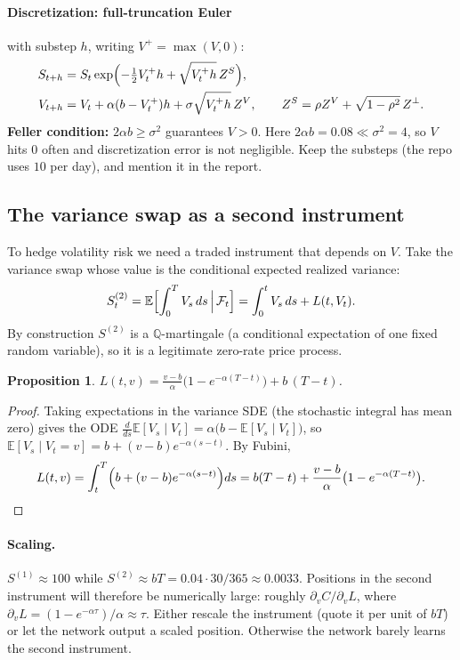 \documentclass[11pt]{article}
\newtheorem{proposition}[theorem]{Proposition}
\theoremstyle{definition}
\theoremstyle{remark}
\newcommand{\E}{\mathbb{E}}
\begin{document}
\paragraph{Discretization: full-truncation Euler} with substep $h$, writing $V^+=\max(V,0)$:
\begin{align*}
S_{t+h}&=S_t\exp\Bigl(-\tfrac12V_t^+h+\sqrt{V_t^+h}\,Z^S\Bigr),\\
V_{t+h}&=V_t+\alpha(b-V_t^+)h+\sigma\sqrt{V_t^+h}\,Z^V,\qquad Z^S=\rho Z^V+\sqrt{1-\rho^2}\,Z^\perp .
\end{align*}
\textbf{Feller condition:} $2\alpha b\ge\sigma^2$ guarantees $V>0$. Here $2\alpha b=0.08\ll\sigma^2=4$, so
$V$ hits $0$ often and discretization error is not negligible. Keep the substeps (the repo uses $10$ per day), and mention it in the report.

\subsection{The variance swap as a second instrument}

To hedge volatility risk we need a traded instrument that depends on $V$. Take the variance swap whose
value is the conditional expected realized variance:
\[
S^{(2)}_t=\E\Bigl[\int_0^TV_s\,ds\,\Big|\,\mathcal F_t\Bigr]=\int_0^tV_s\,ds+L(t,V_t).
\]
By construction $S^{(2)}$ is a $\mathbb Q$-martingale (a conditional expectation of one fixed random variable),
so it is a legitimate zero-rate price process.

\begin{proposition}
$\displaystyle L(t,v)=\frac{v-b}{\alpha}\bigl(1-e^{-\alpha(T-t)}\bigr)+b\,(T-t)$.
\end{proposition}

\begin{proof}
Taking expectations in the variance SDE (the stochastic integral has mean zero) gives the ODE
$\frac{d}{ds}\E[V_s\mid V_t]=\alpha\bigl(b-\E[V_s\mid V_t]\bigr)$, so
$\E[V_s\mid V_t=v]=b+(v-b)e^{-\alpha(s-t)}$. By Fubini,
\[
L(t,v)=\int_t^T\Bigl(b+(v-b)e^{-\alpha(s-t)}\Bigr)ds=b(T-t)+\frac{v-b}{\alpha}\bigl(1-e^{-\alpha(T-t)}\bigr). \qedhere
\]
\end{proof}

\paragraph{Scaling.} $S^{(1)}\approx100$ while $S^{(2)}\approx bT=0.04\cdot30/365\approx0.0033$. Positions in the
second instrument will therefore be numerically large: roughly $\partial_vC/\partial_vL$, where $\partial_vL=(1-e^{-\alpha\tau})/\alpha\approx\tau$.
Either rescale the instrument (quote it per unit of $bT$) or let the network output a scaled position.
Otherwise the network barely learns the second instrument.
\end{document}
